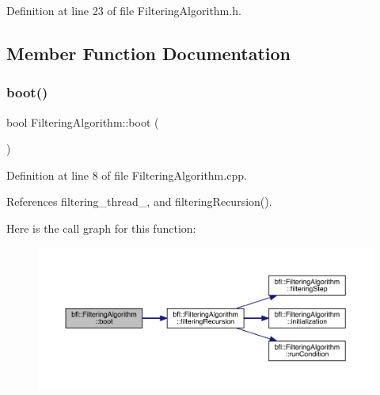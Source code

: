 Definition at line 23 of file Filtering\+Algorithm.\+h.



\subsection{Member Function Documentation}
\mbox{\label{classbfl_1_1FilteringAlgorithm_a96651f8464190c0a56d79219a1017147}} 
\subsubsection{\texorpdfstring{boot()}{boot()}}
{\footnotesize\ttfamily bool Filtering\+Algorithm\+::boot (\begin{DoxyParamCaption}{ }\end{DoxyParamCaption})}



Definition at line 8 of file Filtering\+Algorithm.\+cpp.



References filtering\+\_\+thread\+\_\+, and filtering\+Recursion().

Here is the call graph for this function\+:
\nopagebreak
\begin{figure}[H]
\begin{center}
\leavevmode
\includegraphics[width=350pt]{classbfl_1_1FilteringAlgorithm_a96651f8464190c0a56d79219a1017147_cgraph}
\end{center}
\end{figure}
\mbox{\label{classbfl_1_1Logger_a440467a28ccc46490d767fe0ef6f556a}} 
